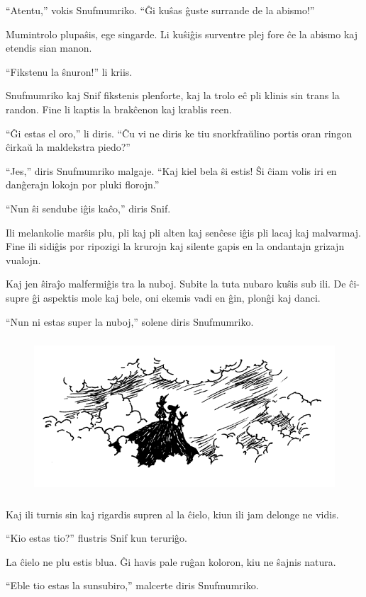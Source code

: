 ``Atentu,'' vokis Snufmumriko. ``Ĝi kuŝas ĝuste surrande de la abismo!''

Mumintrolo plupaŝis, ege singarde. Li kuŝiĝis surventre plej fore ĉe la abismo kaj etendis sian manon.

``Fikstenu la ŝnuron!'' li kriis.

Snufmumriko kaj Snif fikstenis plenforte, kaj la trolo eĉ pli klinis sin trans la randon. Fine li kaptis la brakĉenon kaj krablis reen.

``Ĝi estas el oro,'' li diris. ``Ĉu vi ne diris ke tiu snorkfraŭlino portis oran ringon ĉirkaŭ la maldekstra piedo?''

``Jes,'' diris Snufmumriko malgaje. ``Kaj kiel bela ŝi estis! Ŝi ĉiam volis iri en danĝerajn lokojn por pluki florojn.''

``Nun ŝi sendube iĝis kaĉo,'' diris Snif.

Ili melankolie marŝis plu, pli kaj pli alten kaj senĉese iĝis pli lacaj kaj malvarmaj. Fine ili sidiĝis por ripozigi la krurojn kaj silente gapis en la ondantajn grizajn vualojn.

Kaj jen ŝiraĵo malfermiĝis tra la nuboj. Subite la tuta nubaro kuŝis sub ili. De ĉi-supre ĝi aspektis mole kaj bele, oni ekemis vadi en ĝin, plonĝi kaj danci.

``Nun ni estas super la nuboj,'' solene diris Snufmumriko.

\begin{figure}[htbp]
\centering
\includegraphics[width=350pt,height=165pt]{4-4.png}
\caption{}
\label{4-4}
\end{figure}

Kaj ili turnis sin kaj rigardis supren al la ĉielo, kiun ili jam delonge ne vidis.

``Kio estas tio?'' flustris Snif kun teruriĝo.

La ĉielo ne plu estis blua. Ĝi havis pale ruĝan koloron, kiu ne ŝajnis natura.

``Eble tio estas la sunsubiro,'' malcerte diris Snufmumriko.

